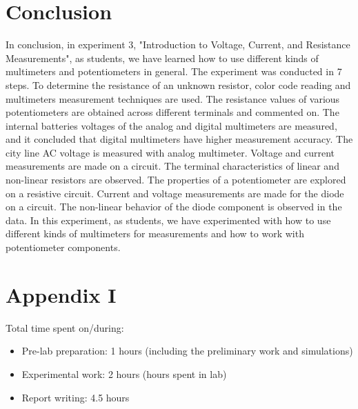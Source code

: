 \documentclass[letterpaper,12pt]{article}
\begin{document}
\section{Conclusion}
In conclusion, in experiment 3, "Introduction to Voltage, Current, and Resistance Measurements", as students, we have learned how to use different kinds of multimeters and potentiometers in general. The experiment was conducted in 7 steps. To determine the resistance of an unknown resistor, color code reading and multimeters measurement techniques are used. The resistance values of various potentiometers are obtained across different terminals and commented on. The internal batteries voltages of the analog and digital multimeters are measured, and it concluded that digital multimeters have higher measurement accuracy. The city line AC voltage is measured with analog multimeter. Voltage and current measurements are made on a circuit. The terminal characteristics of linear and non-linear resistors are observed. The properties of a potentiometer are explored on a resistive circuit. Current and voltage measurements are made for the diode on a circuit. The non-linear behavior of the diode component is observed in the data.  In this experiment, as students, we have experimented with how to use different kinds of multimeters for measurements and how to work with potentiometer components.
\section*{Appendix I}
Total time spent on/during:
\begin{itemize}
	\item Pre-lab preparation: 1 hours (including the preliminary work and simulations) 
	\item Experimental work: 2 hours (hours spent in lab)
	\item Report writing: 4.5 hours 
\end{itemize}



\end{document}
